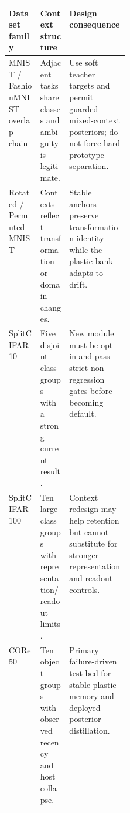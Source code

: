 \begin{tabularx}{\linewidth}{@{}l p{0.24\linewidth} X@{}}
\toprule
Dataset family & Context structure & Design consequence \\
\midrule
MNIST / FashionMNIST overlap chain & Adjacent tasks share classes and ambiguity is legitimate. & Use soft teacher targets and permit guarded mixed-context posteriors; do not force hard prototype separation. \\
Rotated / Permuted MNIST & Contexts reflect transformation or domain changes. & Stable anchors preserve transformation identity while the plastic bank adapts to drift. \\
SplitCIFAR10 & Five disjoint class groups with a strong current result. & New module must be opt-in and pass strict non-regression gates before becoming default. \\
SplitCIFAR100 & Ten large class groups with representation/readout limits. & Context redesign may help retention but cannot substitute for stronger representation and readout controls. \\
CORe50 & Ten object groups with observed recency and host collapse. & Primary failure-driven test bed for stable-plastic memory and deployed-posterior distillation. \\
\bottomrule
\end{tabularx}
